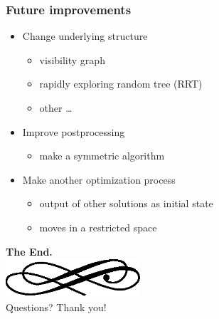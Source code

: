 \begin{frame}
  \frametitle{Future improvements}
  \begin{itemize}
  \item Change underlying \alert{structure}\pause
    \begin{itemize}
    \item visibility graph\pause
    \item rapidly exploring random tree (RRT)\pause
    \item other \dots\pause
    \end{itemize}
  \item Improve \alert{postprocessing}\pause
    \begin{itemize}
    \item make a \alert{symmetric} algorithm\pause
    \end{itemize}
  \item Make another \alert{optimization} process\pause
    \begin{itemize}
    \item output of other solutions as initial state\pause
    \item moves in a restricted space
    \end{itemize}
  \end{itemize}
\end{frame}

\begin{frame}
  \begin{center}
	\textbf{\calligra\Huge The End.}\\
  \includegraphics[width=5cm]{img/ornament.eps}\\[1cm]
	\pause
	{\huge\calligra Questions?\pause{} Thank you!}
  \end{center}
\end{frame}

\appendix

